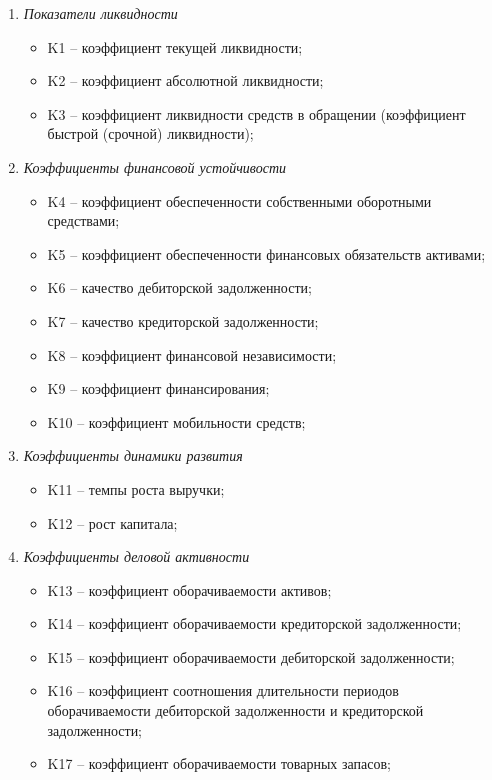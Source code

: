 \documentclass[14pt,a4paper]{extarticle}
\begin{document}
\begin{enumerate}[label=\Roman*.]
    \item \textit{Показатели ликвидности}
    \begin{itemize}
        \item K1 -- коэффициент текущей ликвидности;
        \item K2 -- коэффициент абсолютной ликвидности;
        \item K3 -- коэффициент ликвидности средств в обращении (коэффициент быстрой (срочной) ликвидности);
    \end{itemize}
    
    \item \textit{Коэффициенты финансовой устойчивости}
    \begin{itemize}
        \item K4 -- коэффициент обеспеченности собственными оборотными средствами;
        \item K5 -- коэффициент обеспеченности финансовых обязательств активами;
        \item K6 -- качество дебиторской задолженности;
        \item K7 -- качество кредиторской задолженности;
        \item K8 -- коэффициент финансовой независимости;
        \item K9 -- коэффициент финансирования;
        \item K10 -- коэффициент мобильности средств;
    \end{itemize}
    
    \item \textit{Коэффициенты динамики развития}
    \begin{itemize}
        \item K11 -- темпы роста выручки;
        \item K12 -- рост капитала;
    \end{itemize}
    
    \item \textit{Коэффициенты деловой активности}
    \begin{itemize}
        \item K13 -- коэффициент оборачиваемости активов;
        \item K14 -- коэффициент оборачиваемости кредиторской задолженности;
        \item K15 -- коэффициент оборачиваемости дебиторской задолженности;
        \item K16 -- коэффициент соотношения длительности периодов оборачиваемости дебиторской задолженности и кредиторской задолженности;
        \item K17 -- коэффициент оборачиваемости товарных запасов;
    \end{itemize}
    

\end{enumerate}
\end{document}
